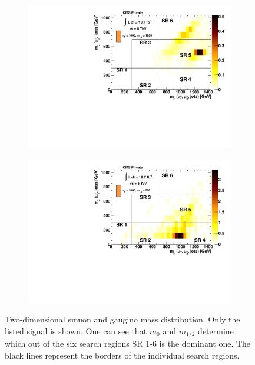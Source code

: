 \begin{figure}[!htb]
  \centering
  \begin{subfigure}[b]{0.7\textwidth}
    \centering
    \includegraphics[width=\textwidth]{plots/signal_1000_1200_m_smu_chi.pdf}
    \caption{\label{fig:sig-1000-1200-m-smu-chi}}
  \end{subfigure}
  \begin{subfigure}[b]{0.7\textwidth}
    \centering
    \includegraphics[width=\textwidth]{plots/signal_1000_200_m_smu_chi.pdf}
    \caption{\label{fig:sig-1000-200-m-smu-chi}}
  \end{subfigure}
  \caption{Two-dimensional smuon and gaugino mass distribution. Only the listed signal is shown. One can see that $m_0$ and $m_{1/2}$ determine which out of the six search regions SR 1-6 is the dominant one. The black lines represent the borders of the individual search regions.}
  \label{fig:sig-m-smu-chi}
\end{figure}

